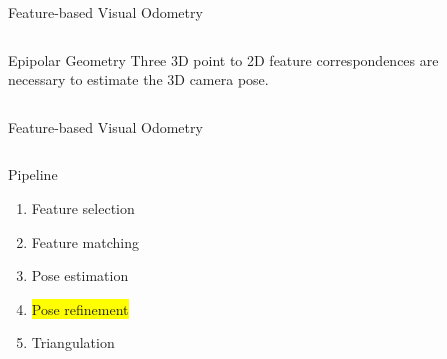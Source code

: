 \documentclass[10pt]{beamer}
\newcommand{\mycite}[1]{ {\color{gray} \citep{#1}} }
\begin{document}
\begin{frame}{Feature-based Visual Odometry}
\begin{columns}
\begin{column}{0.6\textwidth}
	  \end{column}
	\end{columns}
	\begin{columns}
		\begin{column}{0.6\textwidth}
			\begin{block}{Epipolar Geometry}
				Three 3D point to 2D feature correspondences are necessary to estimate the 3D camera pose.
				\mycite{Kneip2011P3P}
			\end{block}
		\end{column}
		\begin{column}{0.4\textwidth}
		\end{column}
	\end{columns}
\end{frame}

\begin{frame}{Feature-based Visual Odometry}
	\begin{columns}
	  \begin{column}{0.4\textwidth}
	  	\begin{block}{Pipeline}
		  	\begin{enumerate}
				\item Feature selection
				\item Feature matching
				\item Pose estimation
				\item \colorbox{yellow}{Pose refinement}
				\item Triangulation
			\end{enumerate}
		\end{block}
		

\end{column}
\end{columns}
\end{frame}
\end{document}
